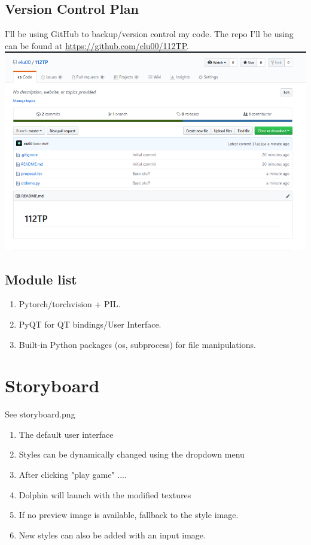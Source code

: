 \documentclass[12pt]{article}
\begin{document}
\subsection{Version Control Plan}
    I'll be using GitHub to backup/version control my code. 
    The repo I'll be using can be found at \href{https://github.com/elu00/112TP}{https://github.com/elu00/112TP}. \\
    \includegraphics[scale=0.8]{screenshot.png}
\subsection{Module list}
\begin{enumerate}
	\item Pytorch/torchvision + PIL.
	\item PyQT for QT bindings/User Interface.
	\item Built-in Python packages (os, subprocess) for file manipulations.
\end{enumerate}
\section{Storyboard}
See storyboard.png
\begin{enumerate}[(1)]
    \item The default user interface
    \item Styles can be dynamically changed using the dropdown menu
    \item After clicking "play game" ....
    \item Dolphin will launch with the modified textures
    \item If no preview image is available, fallback to the style image.
    \item New styles can also be added with an input image.
\end{enumerate}
\end{document}
